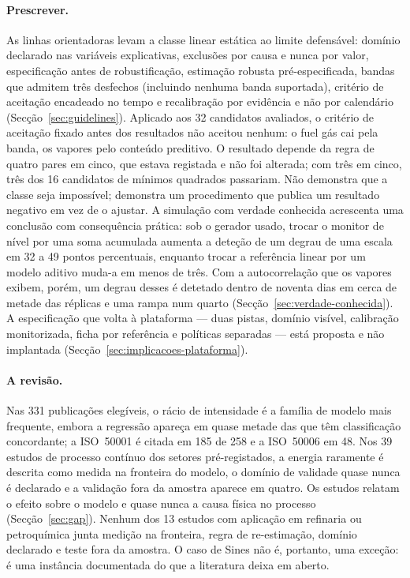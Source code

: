 \paragraph{Prescrever.} As linhas orientadoras levam a classe linear
estática ao limite defensável: domínio declarado nas variáveis explicativas,
exclusões por causa e nunca por valor, especificação antes de robustificação,
estimação robusta pré-especificada, bandas que admitem três desfechos
(incluindo nenhuma banda suportada), critério de aceitação encadeado no
tempo e recalibração por evidência e não por calendário
(Secção~\ref{sec:guidelines}). Aplicado aos 32 candidatos avaliados, o
critério de aceitação fixado antes dos resultados não aceitou nenhum: o fuel
gás cai pela banda, os vapores pelo conteúdo preditivo. O resultado depende
da regra de quatro pares em cinco, que estava registada e não foi alterada;
com três em cinco, três dos 16 candidatos de mínimos quadrados passariam.
Não demonstra que a classe seja impossível; demonstra um procedimento que
publica um resultado negativo em vez de o ajustar. A simulação com verdade
conhecida acrescenta uma conclusão com consequência prática: sob o gerador
usado, trocar o monitor de nível por uma soma acumulada aumenta a deteção de
um degrau de uma escala em 32 a 49 pontos percentuais, enquanto trocar a
referência linear por um modelo aditivo muda-a em menos de três. Com a
autocorrelação que os vapores exibem, porém, um degrau desses é detetado
dentro de noventa dias em cerca de metade das réplicas e uma rampa num
quarto (Secção~\ref{sec:verdade-conhecida}). A especificação que volta à
plataforma --- duas pistas, domínio visível, calibração monitorizada, ficha
por referência e políticas separadas --- está proposta e não implantada
(Secção~\ref{sec:implicacoes-plataforma}).

\paragraph{A revisão.} Nas 331 publicações elegíveis, o rácio de
intensidade é a família de modelo mais frequente, embora a regressão apareça
em quase metade das que têm classificação concordante; a ISO~50001 é citada
em 185 de 258 e a ISO~50006 em 48. Nos 39 estudos de processo contínuo dos
setores pré-registados, a energia raramente é descrita como medida na
fronteira do modelo, o domínio de validade quase nunca é declarado e a
validação fora da amostra aparece em quatro. Os estudos relatam o efeito
sobre o modelo e quase nunca a causa física no processo
(Secção~\ref{sec:gap}). Nenhum dos 13 estudos com aplicação em refinaria ou
petroquímica junta medição na fronteira, regra de re-estimação, domínio
declarado e teste fora da amostra. O caso de Sines não é, portanto, uma
exceção: é uma instância documentada do que a literatura deixa em aberto.

